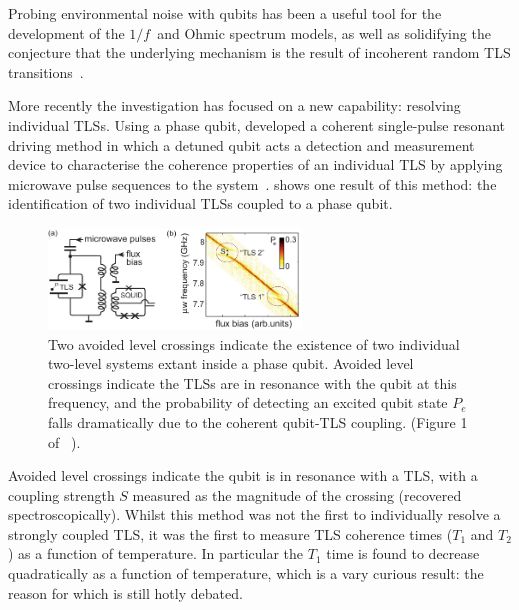 Probing environmental noise with qubits has been a useful tool for the development of the $1/f\,$ and Ohmic spectrum models, as well as solidifying the conjecture that the underlying mechanism is the result of incoherent random TLS transitions~\cite{Shnirman2005}.

More recently the investigation has focused on a new capability: resolving individual TLSs.
Using a phase qubit, \citeauthor{Lisenfeld2010} developed a coherent single-pulse resonant driving method in which a detuned qubit acts a detection and measurement device to characterise the coherence properties of an individual TLS by applying microwave pulse sequences to the system~\cite{Lisenfeld2010}.  shows one result of this method: the identification of two individual TLSs coupled to a phase qubit.

\begin{figure}[htp]
\includegraphics[width=0.6\textwidth]{figures/alclisenfeld2010}
\caption[Avoided Level Crossings in Qubit Spectroscopy]{\label{fig:alc}Two avoided level crossings indicate the existence of two individual two-level systems extant inside a phase qubit. Avoided level crossings indicate the TLSs are in resonance with the qubit at this frequency, and the probability of detecting an excited qubit state $P_e$ falls dramatically due to the coherent qubit-TLS coupling. (Figure 1 of \citeauthor{Lisenfeld2010}~\cite{Lisenfeld2010}).}
\end{figure}

Avoided level crossings indicate the qubit is in resonance with a TLS, with a coupling strength $S$ measured as the magnitude of the crossing (recovered spectroscopically).
Whilst this method was not the first to individually resolve a strongly coupled TLS, it was the first to measure TLS coherence times ($T_1$ and $T_2$) as a function of temperature.
In particular the $T_1$ time is found to decrease quadratically as a function of temperature, which is a vary curious result: the reason for which is still hotly debated.


